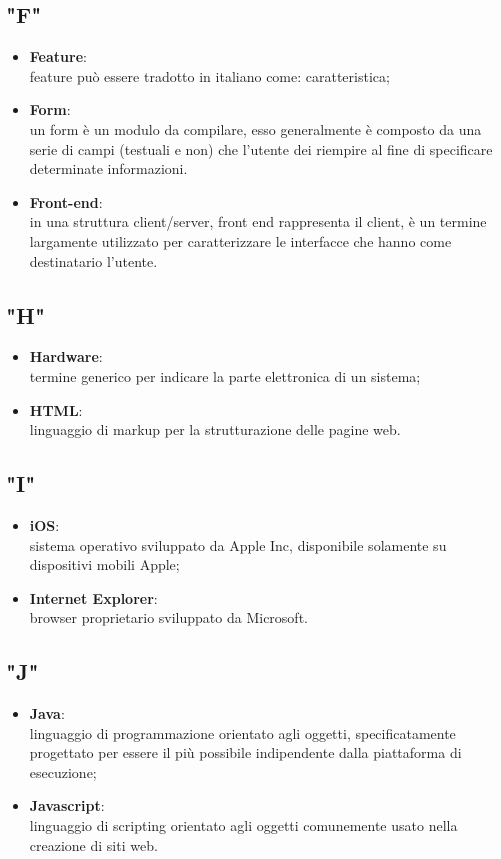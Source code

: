 \subsection{"F"}
\begin{itemize}
\item \textbf{Feature}:\\ feature può essere tradotto in italiano come: caratteristica;
\item \textbf{Form}:\\ un form è un modulo da compilare, esso generalmente è composto da una serie di campi (testuali e non) che l'utente dei riempire al fine di specificare determinate informazioni.
\item \textbf{Front-end}:\\ in una struttura client/server, front end rappresenta il client, è un termine largamente utilizzato per caratterizzare le interfacce che hanno come destinatario l'utente.
\end{itemize}

\subsection{"H"}
\begin{itemize}
\item \textbf{Hardware}:\\ termine generico per indicare la parte elettronica di un sistema;
\item \textbf{HTML}:\\ linguaggio di markup per la strutturazione delle pagine web.
\end{itemize}

\subsection{"I"}
\begin{itemize}
\item \textbf{iOS}:\\ sistema operativo sviluppato da Apple Inc, disponibile solamente su dispositivi mobili Apple;
\item \textbf{Internet Explorer}:\\ browser proprietario sviluppato da Microsoft.
\end{itemize}

\subsection{"J"}
\begin{itemize}
\item \textbf{Java}:\\ linguaggio di programmazione orientato agli oggetti, specificatamente progettato per essere il più possibile indipendente dalla piattaforma di esecuzione;
\item \textbf{Javascript}:\\ linguaggio di scripting orientato agli oggetti comunemente usato nella creazione di siti web.
\end{itemize}

